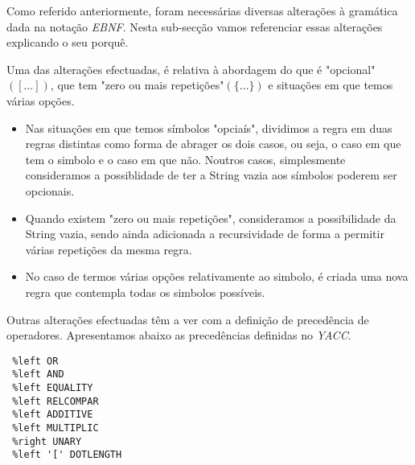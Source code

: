 \documentclass[11pt,a4paper]{article}
\begin{document}
Como referido anteriormente, foram necessárias diversas alterações à gramática dada na notação \emph{EBNF}. Nesta sub-secção vamos referenciar essas alterações explicando o seu porquê.

Uma das alterações efectuadas, é relativa à abordagem do que é "opcional"$([\dots])$, que tem "zero ou mais repetições"$(\{\dots\})$ e situações em que temos várias opções.

\begin{itemize}
	\item Nas situações em que temos símbolos "opciaís", dividimos a regra em duas regras distintas como forma de abrager os dois casos, ou seja, o caso em que tem o simbolo e o caso em que não. Noutros casos, simplesmente consideramos a possiblidade de ter a String vazia aos símbolos poderem ser opcionais.
	
	\item Quando existem "zero ou mais repetições", consideramos a possibilidade da String vazia, sendo ainda adicionada a recursividade de forma a permitir várias repetições da mesma regra.
	
	\item No caso de termos várias opções relativamente ao simbolo, é criada uma nova regra que contempla todas os simbolos possíveis.  
\end{itemize} 

Outras alterações efectuadas têm a ver com a definição de precedência de operadores. Apresentamos abaixo as precedências definidas no \emph{YACC}.

\newpage 
 
\begin{lstlisting}
 %left OR
 %left AND
 %left EQUALITY
 %left RELCOMPAR
 %left ADDITIVE
 %left MULTIPLIC
 %right UNARY
 %left '[' DOTLENGTH
\end{lstlisting}
\end{document}
